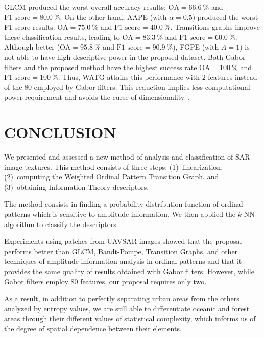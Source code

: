\documentclass[journal]{IEEEtran}
\begin{document}
	GLCM produced the worst overall accuracy results: $\text{OA}=\SI{66.6}{\percent}$ and $\text{F1-score}=\SI{80.0}{\percent}$.
	On the other hand, AAPE (with $\alpha = 0.5$) produced the worst F1-score results:
	$\text{OA}=\SI{75.0}{\percent}$ and $\text{F1-score}=\SI{40.0}{\percent}$.
	Transitions graphs improve these classification results, leading to  $\text{OA}=\SI{83.3}{\percent}$ and $\text{F1-score}=\SI{60.0}{\percent}$.
	Although better ($\text{OA}=\SI{95.8}{\percent}$ and $\text{F1-score}=\SI{90.9}{\percent}$), FGPE (with $A = 1$) is not able to have high descriptive power in the proposed dataset.
	Both Gabor filters and the proposed method have the highest success rate $\text{OA}=\SI{100}{\percent}$ and $\text{F1-score}=\SI{100}{\percent}$.
	Thus, WATG attains this performance with $2$ features instead of the $80$ employed by Gabor filters.
	This reduction implies less computational power requirement and avoids the curse of dimensionality~\cite{TheCursesofDimensionality2018}.
	
	\section{CONCLUSION}\label{Conclusion}
	
	We presented and assessed a new method of analysis and classification of SAR image textures.
	This method consists of three steps: 
	(1)~linearization, 
	(2)~computing the Weighted Ordinal Pattern Transition Graph, and 
	(3)~obtaining Information Theory descriptors.
	
	The method consists in finding a probability distribution function of ordinal patterns which is sensitive to amplitude information.
	We then applied the $k$-NN algorithm to classify the descriptors.
	
	Experiments using patches from UAVSAR images showed that the proposal performs better than GLCM, Bandt-Pompe, Transition Graphs, and other techniques of amplitude information analysis in ordinal patterns and that it provides the same quality of results obtained with Gabor filters.
	However, while Gabor filters employ $80$ features, our proposal requires only two.
	
	As a result, in addition to perfectly separating urban areas from the others analyzed by entropy values, we are still able to differentiate oceanic and forest areas through their different values of statistical complexity, which informs us of the degree of spatial dependence between their elements.
	
\end{document}
